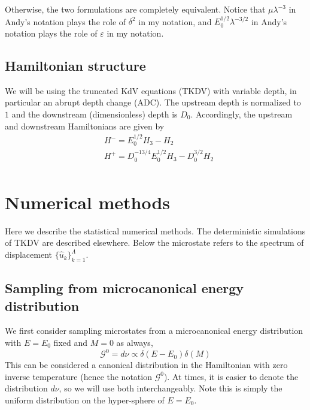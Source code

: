 \documentclass[12pt]{article}
\newcommand{\np}{\newpage \noindent}
\newcommand{\eps}{\varepsilon}
\newcommand{\uhat}{\hat{u}}
\newcommand{\Gibbs}{\mathcal{G}}
\begin{document}
Otherwise, the two formulations are completely equivalent. Notice that $\mu \lambda^{-3}$ in Andy's notation plays the role of $\delta^2$ in my notation, and $E_0^{1/2} \lambda^{-3/2}$ in Andy's notation plays the role of $\eps$ in my notation.


\np
\subsection{Hamiltonian structure}
We will be using the truncated KdV equations (TKDV) with variable depth, in particular an abrupt depth change (ADC). The upstream depth is normalized to $1$ and the downstream (dimensionless) depth is $D_0$. Accordingly, the upstream and downstream Hamiltonians are given by
\begin{align}
\label{Hamiltonian}
& H^- = E_0^{1/2} H_3 - H_2 \\
& H^+ = D_0^{-13/4} E_0^{1/2} H_3 - D_0^{3/2} H_2 \\
\end{align}


\section{Numerical methods}

Here we describe the statistical numerical methods. The deterministic simulations of TKDV are described elsewhere. Below the microstate refers to the spectrum of displacement $\{ \uhat_k \}_{k=1}^{\Lambda}$.

\subsection{Sampling from microcanonical energy distribution}
\label{sec_microcan}

We first consider sampling microstates from a microcanonical energy distribution with $E=E_0$ fixed and $M=0$ as always,
\begin{equation}
\Gibbs^0 = d\nu \propto \delta(E-E_0) \delta(M)
\end{equation}
This can be considered a canonical distribution in the Hamiltonian with zero inverse temperature (hence the notation $\Gibbs^0$). At times, it is easier to denote the distribution $d\nu$, so we will use both interchangeably. Note this is simply the uniform distribution on the hyper-sphere of $E=E_0$.
\end{document}
